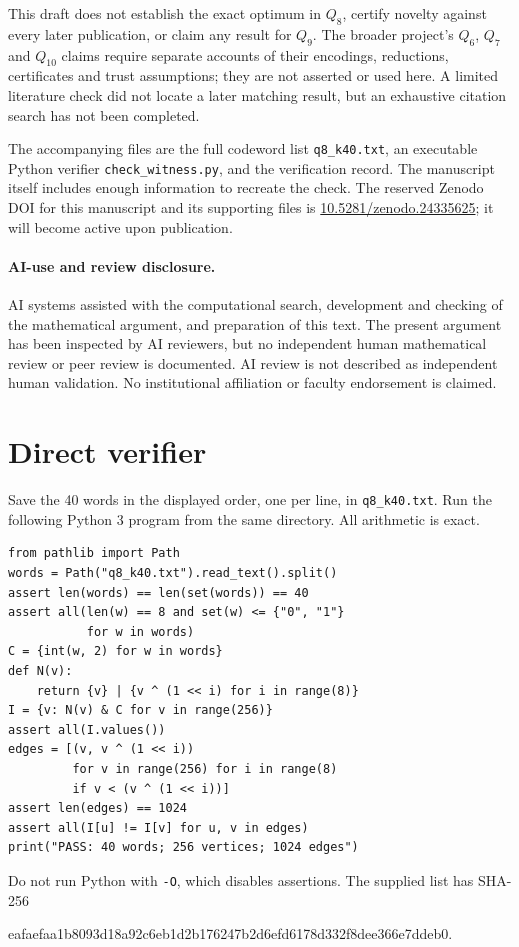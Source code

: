 \documentclass[11pt]{article}
\begin{document}
This draft does not establish the exact optimum in $Q_8$, certify novelty against every later publication, or claim any result for $Q_9$. The broader project's $Q_6$, $Q_7$ and $Q_{10}$ claims require separate accounts of their encodings, reductions, certificates and trust assumptions; they are not asserted or used here. A limited literature check did not locate a later matching result, but an exhaustive citation search has not been completed.

The accompanying files are the full codeword list \texttt{q8\_k40.txt}, an executable Python verifier \texttt{check\_witness.py}, and the verification record. The manuscript itself includes enough information to recreate the check. The reserved Zenodo DOI for this manuscript and its supporting files is \href{https://doi.org/10.5281/zenodo.24335625}{10.5281/zenodo.24335625}; it will become active upon publication.

\paragraph{AI-use and review disclosure.}
AI systems assisted with the computational search, development and checking of the mathematical argument, and preparation of this text. The present argument has been inspected by AI reviewers, but no independent human mathematical review or peer review is documented. AI review is not described as independent human validation. No institutional affiliation or faculty endorsement is claimed.

\appendix
\section{Direct verifier}\label{verifier}
Save the 40 words in the displayed order, one per line, in \texttt{q8\_k40.txt}. Run the following Python 3 program from the same directory. All arithmetic is exact.
\begin{lstlisting}[basicstyle=\ttfamily\small,breaklines=true,frame=single]
from pathlib import Path
words = Path("q8_k40.txt").read_text().split()
assert len(words) == len(set(words)) == 40
assert all(len(w) == 8 and set(w) <= {"0", "1"}
           for w in words)
C = {int(w, 2) for w in words}
def N(v):
    return {v} | {v ^ (1 << i) for i in range(8)}
I = {v: N(v) & C for v in range(256)}
assert all(I.values())
edges = [(v, v ^ (1 << i))
         for v in range(256) for i in range(8)
         if v < (v ^ (1 << i))]
assert len(edges) == 1024
assert all(I[u] != I[v] for u, v in edges)
print("PASS: 40 words; 256 vertices; 1024 edges")
\end{lstlisting}
Do not run Python with \texttt{-O}, which disables assertions. The supplied list has SHA-256
\begin{center}\footnotesize\ttfamily
 eafaefaa1b8093d18a92c6eb1d2b176247b2d6efd6178d332f8dee366e7ddeb0.
\end{center}
\end{document}
